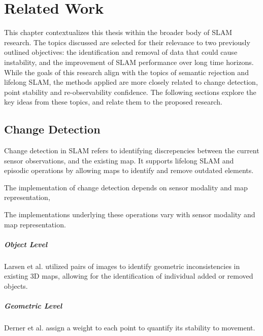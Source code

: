 \section{Related Work}
\label{sec:related_work}

This chapter contextualizes this thesis within the broader body of SLAM research. The topics discussed are selected for their relevance to two previously outlined objectives: the identification and removal of data that could cause instability, and the improvement of SLAM performance over long time horizons. While the goals of this research align with the topics of semantic rejection and lifelong SLAM, the methods applied are more closely related to change detection, point stability and re-observability confidence. The following sections explore the key ideas from these topics, and relate them to the proposed research.

\subsection{Change Detection}

Change detection in SLAM refers to identifying discrepencies between the current sensor observations, and the existing map. It supports lifelong SLAM and episodic operations by allowing maps to identify and remove outdated elements.

The implementation of change detection depends on sensor modality and map representation, 

The implementations underlying these operations vary with sensor modality and map representation.




\subparagraph{Object Level}
Larsen et al. \cite{larsenChangeDetectionModel} utilized pairs of images to identify geometric inconsistencies in existing 3D maps, allowing for the identification of individual added or removed objects.

\subparagraph{Geometric Level}
Derner et al. \cite{dernerChangeDetectionUsing2021} assign a weight to each point to quantify its stability to movement.




